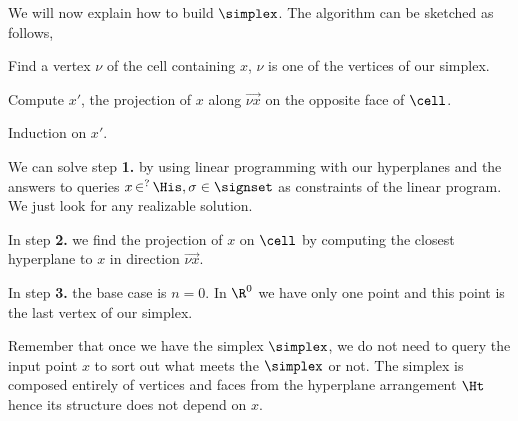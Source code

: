 We will now explain how to build $\simplex$. The algorithm can be sketched as
follows,

\begin{description}
\addtolength{\itemsep}{-0.5\baselineskip}
\item[1.$\;$] Find a vertex $\nu$ of the cell containing $x$, $\nu$ is one of
the vertices of our simplex.
\item[2.$\;$] Compute $x'$, the projection of $x$ along $\vec{\nu x}$ on the
opposite face of $\cell$.
\item[3.$\;$] Induction on $x'$.
\end{description}

We can solve step \textbf{1.} by using linear programming with our
 hyperplanes and the
answers to queries $x \mathop{\in}^{?} \His, \sigma \in \signset$ as
constraints of the linear program. We just look for any realizable solution.

In step \textbf{2.} we find the projection of $x$ on $\cell$ by computing the
closest hyperplane to $x$ in direction $\vec{\nu x}$.

In step \textbf{3.} the base case is $n = 0$. In $\R^0$ we have only one point
and this point is the last vertex of our simplex.

Remember that once we have the simplex $\simplex$, we do not need to query the input point
$x$ to sort out what meets the $\simplex$ or not. The simplex is composed
entirely of vertices and faces from the hyperplane arrangement $\Ht$ hence its
structure does not depend on $x$.










